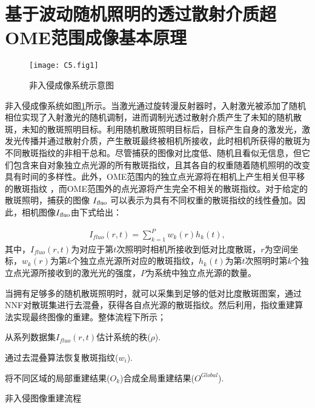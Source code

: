 \section{基于波动随机照明的透过散射介质超OME范围成像基本原理}

\begin{figure}[htp]
	\centering
	\texttt{[image: C5.fig1]}
	\caption{非入侵成像系统示意图}
	\label{fig:5.1}
\end{figure}

非入侵成像系统如图\ref{fig:5.1}所示。当激光通过旋转漫反射器时，入射激光被添加了随机相位实现了入射激光的随机调制，进而调制光透过散射介质产生了未知的随机散斑，未知的散斑照明目标。利用随机散斑照明目标后，目标产生自身的激发光，激发光传播并通过散射介质，产生散斑最终被相机所接收，此时相机所获得的散斑为不同散斑指纹的非相干总和。尽管捕获的图像对比度低、随机且看似无信息，但它们包含来自对象独立点光源的所有散斑指纹，且其各自的权重随着随机照明的改变具有时间的多样性。此外，OME范围内的独立点光源将在相机上产生相关但平移的散斑指纹 \cite{Freund1988}，而OME范围外的点光源将产生完全不相关的散斑指纹。对于给定的散斑照明，捕获的图像 $I_{\textsl{fluo}}$ 可以表示为具有不同权重的散斑指纹的线性叠加。因此，相机图像$I_{\textsl{fluo}}$由下式给出：

\begin{equation}
\begin{aligned}
I_{fluo}(r,t) = \sum^{P}_{k=1} w_{k}(r) h_{k}(t),
\label{eq:5.1}
\end{aligned}
\end{equation}
其中，$I_{fluo}(r,t)$为对应于第$t$次照明时相机所接收到低对比度散斑，$r$为空间坐标，$w_{k}(r)$为第$k$个独立点光源所对应的散斑指纹，$h_{k}(t)$为第$t$次照明时第$k$个独立点光源所接收到的激光光的强度，$P$为系统中独立点光源的数量。

当拥有足够多的随机散斑照明时，就可以采集到足够的低对比度散斑图案，通过NNF对散斑集进行去混叠，获得各自点光源的散斑指纹。然后利用，指纹重建算法实现最终图像的重建。整体流程下所示；
\begin{algorithm2e}[h!]
\DontPrintSemicolon
\SetAlgoLined
{}
从系列数据集$I_{fluo}(r,t)$估计系统的秩($\rho$).\;

通过去混叠算法恢复散斑指纹($w_{i}$).\;


将不同区域的局部重建结果($O_{k}$)合成全局重建结果($O^{Global}$).\;

\caption{非入侵图像重建流程}
\label{alg:a1}
\end{algorithm2e}

